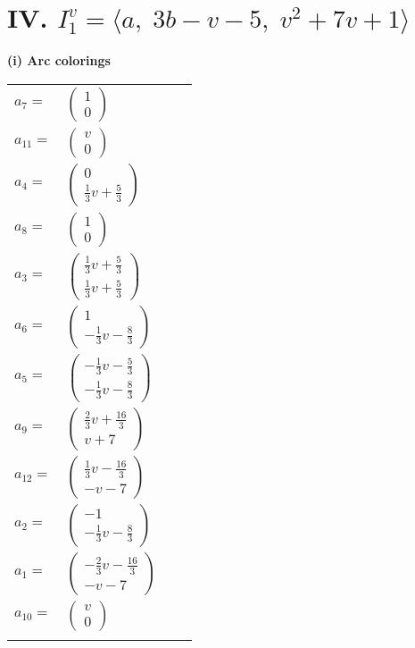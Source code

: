 \documentclass[1p]{elsarticle_modified}
\theoremstyle{definition}
\begin{document}
\centering \section*{IV. $I^v_{1}= \langle a,\;3 b- v-5,\;v^2+7 v+1 \rangle$}
\flushleft \textbf{(i) Arc colorings}\\
\begin{tabular}{m{7pt} m{180pt} m{7pt} m{180pt} }
\flushright $a_{7}=$&$\begin{pmatrix}1\\0\end{pmatrix}$ \\
\flushright $a_{11}=$&$\begin{pmatrix}v\\0\end{pmatrix}$ \\
\flushright $a_{4}=$&$\begin{pmatrix}0\\\frac{1}{3} v+\frac{5}{3}\end{pmatrix}$ \\
\flushright $a_{8}=$&$\begin{pmatrix}1\\0\end{pmatrix}$ \\
\flushright $a_{3}=$&$\begin{pmatrix}\frac{1}{3} v+\frac{5}{3}\\\frac{1}{3} v+\frac{5}{3}\end{pmatrix}$ \\
\flushright $a_{6}=$&$\begin{pmatrix}1\\-\frac{1}{3} v-\frac{8}{3}\end{pmatrix}$ \\
\flushright $a_{5}=$&$\begin{pmatrix}-\frac{1}{3} v-\frac{5}{3}\\-\frac{1}{3} v-\frac{8}{3}\end{pmatrix}$ \\
\flushright $a_{9}=$&$\begin{pmatrix}\frac{2}{3} v+\frac{16}{3}\\v+7\end{pmatrix}$ \\
\flushright $a_{12}=$&$\begin{pmatrix}\frac{1}{3} v-\frac{16}{3}\\- v-7\end{pmatrix}$ \\
\flushright $a_{2}=$&$\begin{pmatrix}-1\\-\frac{1}{3} v-\frac{8}{3}\end{pmatrix}$ \\
\flushright $a_{1}=$&$\begin{pmatrix}-\frac{2}{3} v-\frac{16}{3}\\- v-7\end{pmatrix}$ \\
\flushright $a_{10}=$&$\begin{pmatrix}v\\0\end{pmatrix}$\\&\end{tabular}
\end{document}

